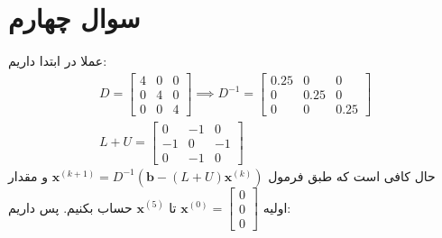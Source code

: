 \documentclass[]{article}
\begin{document}
\printheader

\section*{سوال چهارم}
عملا در ابتدا داریم:
\begin{gather*}
    D = \begin{bmatrix}
        4 & 0 & 0\\
        0 & 4 & 0\\
        0 & 0 & 4
    \end{bmatrix}
    \implies
    D^{-1} = \begin{bmatrix}
        0.25 & 0 & 0\\
        0 & 0.25 & 0\\
        0 & 0 & 0.25
    \end{bmatrix}\\
    L + U = \begin{bmatrix}
        0 & -1 & 0\\
        -1 & 0 & -1\\
        0 & -1 & 0
    \end{bmatrix}
\end{gather*}
حال کافی است که طبق فرمول
$\mathbf{x}^{(k+1)} = D^{-1} (\mathbf{b} - (L+U) \mathbf{x}^{(k)})$
و مقدار اولیه
$\mathbf{x}^{(0)} = \begin{bmatrix}
    0\\
    0\\
    0 
\end{bmatrix}$
تا
$\mathbf{x}^{(5)}$
حساب بکنیم. پس داریم:
\end{document}
